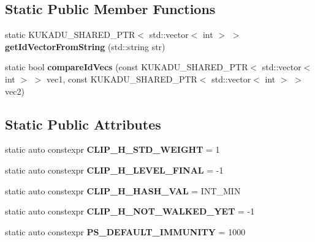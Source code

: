 \subsection*{Static Public Member Functions}
\begin{DoxyCompactItemize}
\item 
static K\+U\+K\+A\+D\+U\+\_\+\+S\+H\+A\+R\+E\+D\+\_\+\+P\+TR$<$ std\+::vector$<$ int $>$ $>$ {\bfseries get\+Id\+Vector\+From\+String} (std\+::string str)\hypertarget{classkukadu_1_1Clip_a4aeb1954ae45ed377d3563c79f083329}{}\label{classkukadu_1_1Clip_a4aeb1954ae45ed377d3563c79f083329}

\item 
static bool {\bfseries compare\+Id\+Vecs} (const K\+U\+K\+A\+D\+U\+\_\+\+S\+H\+A\+R\+E\+D\+\_\+\+P\+TR$<$ std\+::vector$<$ int $>$ $>$ vec1, const K\+U\+K\+A\+D\+U\+\_\+\+S\+H\+A\+R\+E\+D\+\_\+\+P\+TR$<$ std\+::vector$<$ int $>$ $>$ vec2)\hypertarget{classkukadu_1_1Clip_aa8186f0de64ebc0a45c502619c38b020}{}\label{classkukadu_1_1Clip_aa8186f0de64ebc0a45c502619c38b020}

\end{DoxyCompactItemize}
\subsection*{Static Public Attributes}
\begin{DoxyCompactItemize}
\item 
static auto constexpr {\bfseries C\+L\+I\+P\+\_\+\+H\+\_\+\+S\+T\+D\+\_\+\+W\+E\+I\+G\+HT} = 1\hypertarget{classkukadu_1_1Clip_aabb0a95265bfa62d72c31013ea8f7cdb}{}\label{classkukadu_1_1Clip_aabb0a95265bfa62d72c31013ea8f7cdb}

\item 
static auto constexpr {\bfseries C\+L\+I\+P\+\_\+\+H\+\_\+\+L\+E\+V\+E\+L\+\_\+\+F\+I\+N\+AL} = -\/1\hypertarget{classkukadu_1_1Clip_a4d850c8f762ca53f770d32a3cafba8a0}{}\label{classkukadu_1_1Clip_a4d850c8f762ca53f770d32a3cafba8a0}

\item 
static auto constexpr {\bfseries C\+L\+I\+P\+\_\+\+H\+\_\+\+H\+A\+S\+H\+\_\+\+V\+AL} = I\+N\+T\+\_\+\+M\+IN\hypertarget{classkukadu_1_1Clip_a3a5e040fd53bb4e2cad94684fc26b28a}{}\label{classkukadu_1_1Clip_a3a5e040fd53bb4e2cad94684fc26b28a}

\item 
static auto constexpr {\bfseries C\+L\+I\+P\+\_\+\+H\+\_\+\+N\+O\+T\+\_\+\+W\+A\+L\+K\+E\+D\+\_\+\+Y\+ET} = -\/1\hypertarget{classkukadu_1_1Clip_a251825c8f72353350397ddf500ae8c69}{}\label{classkukadu_1_1Clip_a251825c8f72353350397ddf500ae8c69}

\item 
static auto constexpr {\bfseries P\+S\+\_\+\+D\+E\+F\+A\+U\+L\+T\+\_\+\+I\+M\+M\+U\+N\+I\+TY} = 1000\hypertarget{classkukadu_1_1Clip_a2b57ae13646bdc1f95bbaa8c3bc8c6e6}{}\label{classkukadu_1_1Clip_a2b57ae13646bdc1f95bbaa8c3bc8c6e6}

\end{DoxyCompactItemize}
